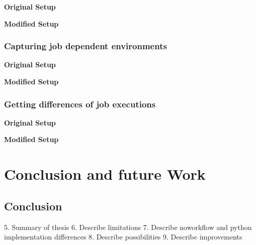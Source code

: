 \documentclass[draft,final]{vutinfth} %
\begin{document}
\textbf{Original Setup}

\textbf{Modified Setup}



\subsection{Capturing job dependent environments}\label{Evaluation:Use Case2}

\textbf{Original Setup}

\textbf{Modified Setup}

\subsection{Getting differences of job executions}\label{Evaluation:Use Case3}

\textbf{Original Setup}

\textbf{Modified Setup}

\chapter{Conclusion and future Work}\label{Conclusion}

\section{Conclusion}

5.	Summary of thesis
6.	Describe limitations
7.	Describe noworkflow and python implementation differences 
8.	Describe possibilities
9.	Describe improvements
\end{document}
